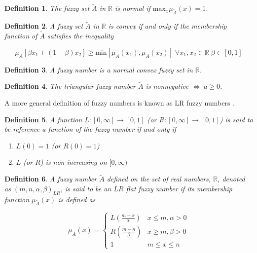 \documentclass[11pt,a4paper,final]{article}
\newtheorem{definition}{Definition}[section]
\begin{document}
\begin{definition}
The fuzzy set \(\tilde{A}\) in \(\mathbb{R}\) is normal if \(\text{max}_x \mu_{\tilde{A}}(x) = 1\).
\end{definition}

\begin{definition}
A fuzzy set \(\tilde{A}\) in \(\mathbb{R}\) is convex if and only if the membership function of \(\tilde{A}\) satisfies the inequality

\begin{equation*}
\mu_{\tilde{A}}[\beta x_1 + (1-\beta)x_2] \ge \text{min}[\mu_{\tilde{A}}(x_1), \mu_{\tilde{A}}(x_2)]\; \forall x_1, x_2 \in \mathbb{R}\; \beta \in [0,1]
\end{equation*}
\end{definition}

\begin{definition}
A fuzzy number is a normal convex fuzzy set in \(\mathbb{R}\).
\end{definition}

\begin{definition}
The triangular fuzzy number \(\tilde{A}\) is nonnegative \(\iff\; a \ge 0\).
\end{definition}

A more general definition of fuzzy numbers is known as LR fuzzy numbers
\cite{kaur-2016-introd-fuzzy,zimmermann-2001-fuzzy-set}.

\begin{definition}
A function \(L:[0,\infty] \rightarrow [0,1]\) (or \(R:[0,\infty] \rightarrow [0,1]\)) is said to be reference a function of the fuzzy number if and only
if

\begin{enumerate}
\item \(L(0) = 1\) (or \(R(0) = 1\))
\item \(L\) (or \(R\)) is non-increasing on \([0,\infty)\)
\end{enumerate}
\end{definition}

\begin{definition}
A fuzzy number \(\tilde{A}\) defined on the set of real numbers, \(\mathbb{R}\), denoted as \((m,n,\alpha,\beta)_{LR}\), is said to be an \(LR\)
flat fuzzy number if its membership function \(\mu_{\tilde{A}}(x)\) is defined as

\begin{equation}
\mu_{\tilde{A}}(x) =
\begin{cases}
L(\frac{m-x}{\alpha}) & x \le m, \alpha > 0 \\
R(\frac{m-n}{\beta}) & x \ge m, \beta > 0 \\
1                & m \le x \le n
\end{cases}
\end{equation}
\end{definition}
\end{document}
